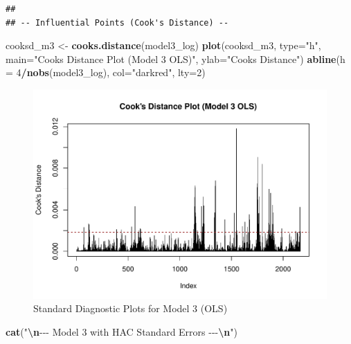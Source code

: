 \documentclass[
]{article}
\newenvironment{Shaded}{\begin{snugshade}}{\end{snugshade}}
\newcommand{\AttributeTok}[1]{\textcolor[rgb]{0.13,0.29,0.53}{#1}}
\newcommand{\DecValTok}[1]{\textcolor[rgb]{0.00,0.00,0.81}{#1}}
\newcommand{\FunctionTok}[1]{\textcolor[rgb]{0.13,0.29,0.53}{\textbf{#1}}}
\newcommand{\NormalTok}[1]{#1}
\newcommand{\OtherTok}[1]{\textcolor[rgb]{0.56,0.35,0.01}{#1}}
\newcommand{\SpecialCharTok}[1]{\textcolor[rgb]{0.81,0.36,0.00}{\textbf{#1}}}
\newcommand{\StringTok}[1]{\textcolor[rgb]{0.31,0.60,0.02}{#1}}
\begin{document}
\begin{verbatim}
## 
## -- Influential Points (Cook's Distance) --
\end{verbatim}

\begin{Shaded}
\begin{Highlighting}[]
\NormalTok{  cooksd\_m3 }\OtherTok{\textless{}{-}} \FunctionTok{cooks.distance}\NormalTok{(model3\_log)}
  \FunctionTok{plot}\NormalTok{(cooksd\_m3, }\AttributeTok{type=}\StringTok{"h"}\NormalTok{, }\AttributeTok{main=}\StringTok{"Cook\textquotesingle{}s Distance Plot (Model 3 OLS)"}\NormalTok{, }\AttributeTok{ylab=}\StringTok{"Cook\textquotesingle{}s Distance"}\NormalTok{)}
  \FunctionTok{abline}\NormalTok{(}\AttributeTok{h =} \DecValTok{4}\SpecialCharTok{/}\FunctionTok{nobs}\NormalTok{(model3\_log), }\AttributeTok{col=}\StringTok{"darkred"}\NormalTok{, }\AttributeTok{lty=}\DecValTok{2}\NormalTok{)}
\end{Highlighting}
\end{Shaded}

\begin{figure}
\centering
\includegraphics{FinalProject_files/figure-latex/model3-parsimonious-log-log-5.pdf}
\caption{Standard Diagnostic Plots for Model 3 (OLS)}
\end{figure}

\begin{Shaded}
\begin{Highlighting}[]
  \FunctionTok{cat}\NormalTok{(}\StringTok{"}\SpecialCharTok{\textbackslash{}n}\StringTok{{-}{-}{-} Model 3 with HAC Standard Errors {-}{-}{-}}\SpecialCharTok{\textbackslash{}n}\StringTok{"}\NormalTok{)}
\end{Highlighting}
\end{Shaded}
\end{document}
